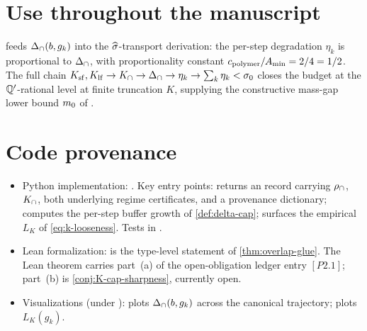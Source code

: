 \section{Use throughout the manuscript}
\label{sec:overlap-kp-downstream}

 feeds $\Delta_{\cap}(b, g_k)$ into the
$\widehat{\sigma}$-transport derivation: the per-step degradation $\eta_k$ is
proportional to $\Delta_{\cap}$, with proportionality constant
$c_{\mathrm{polymer}} / A_{\min} = 2/4 = 1/2$.  The full chain
$K_{\mathrm{sf}}, K_{\mathrm{lf}} \to K_{\cap} \to \Delta_{\cap} \to \eta_k \to \sum_k \eta_k <
\sigma_0$ closes the budget at the $\mathbb{Q}'$-rational level at finite
truncation $K$, supplying the constructive mass-gap lower bound
$m_0$ of .

\section{Code provenance}
\label{sec:overlap-kp-codeanchor}

\begin{itemize}
  \item Python implementation:
    .  Key entry points:
     returns an
     record carrying $\rho_{\cap}$, $K_{\cap}$, both
    underlying regime certificates, and a provenance dictionary;
     computes the
    per-step buffer growth of \cref{def:delta-cap};
    surfaces the empirical $L_K$ of \eqref{eq:k-looseness}.
    Tests in .
  \item Lean formalization:
    is the type-level statement of \cref{thm:overlap-glue}.  The
    Lean theorem carries part~(a) of the open-obligation ledger
    entry $[P2.1]$; part~(b) is \cref{conj:K-cap-sharpness},
    currently open.
  \item Visualizations (under ):
     plots $\Delta_{\cap}(b, g_k)$ across
    the canonical trajectory; 
    plots $L_K(g_k)$.
\end{itemize}
